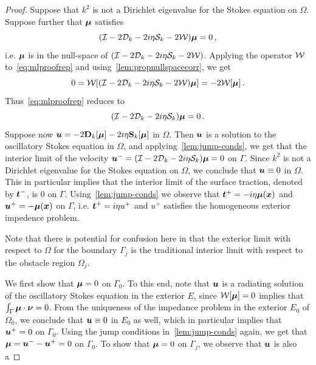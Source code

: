 \begin{proof}
  Suppose that $k^2$ is not a Dirichlet eigenvalue for the
  Stokes equation on $\Omega$. Suppose further that ${\boldsymbol \mu}$ satisfies
  \begin{equation}
    (\mathcal I - 2{\mathcal D}_{k} -2i\eta{\mathcal S}_{k} - 2{\mathcal W}) {\boldsymbol \mu} = 0 \, ,
    \label{eq:mlproofrep}
  \end{equation}
i.e. ${\boldsymbol \mu}$ is in the null-space
of $(\mathcal I - 2 {\mathcal D}_{k} - 2i\eta {\mathcal S}_{k} - 2 {\mathcal W})$. 
Applying the operator ${\mathcal W}$ to~\cref{eq:mlproofrep} and 
using~\cref{lem:propnullspacecorr}, we get
\begin{equation}
0 = {\mathcal W} [(\mathcal I - 2{\mathcal D}_{k} - 2i\eta{\mathcal S}_{k} - 2{\mathcal W}){\boldsymbol \mu}] = -2{\mathcal W} [{\boldsymbol \mu}] \, .
\end{equation}
Thus~\cref{eq:mlproofrep} reduces to
\begin{equation}
(\mathcal I - 2 {\mathcal D}_{k} - 2i\eta {\mathcal S}_{k}){\boldsymbol \mu} = 0\, .
\end{equation}
Suppose now ${\boldsymbol u} = -2{\bf D}_{k}[{\boldsymbol \mu}] -2i\eta{\bf S}_{k}[{\boldsymbol \mu}]$
in $\Omega$. Then ${\boldsymbol u}$ is a solution to the oscillatory
Stokes equation in $\Omega$, and applying~\cref{lem:jump-conds},
we get that the interior limit of the velocity
${\boldsymbol u}^{-} = (\mathcal I - 2{\mathcal D}_{k} -2i\eta{\mathcal S}_{k}) {\boldsymbol \mu} = 0$ on $\Gamma$.
Since $k^2$ is not a Dirichlet eigenvalue for the Stokes equation
on $\Omega$, we conclude that ${\boldsymbol u} \equiv 0$ in $\Omega$. 
This in particular implies that the interior limit of the
surface traction, denoted by ${\boldsymbol t}^{-}$, is $0$ on $\Gamma$.
Using~\cref{lem:jump-conds} we observe that ${\boldsymbol t}^{+}
= -i\eta {\boldsymbol \mu}({\boldsymbol x})$ and ${\boldsymbol u}^{+} = -{\boldsymbol \mu}({\boldsymbol x})$ on $\Gamma$, i.e.
${\boldsymbol t}^{+}=i\eta u^{+}$ and $u^{+}$ satisfies the homogeneous
exterior impedence problem.
\begin{remark}
  Note that there is potential for confusion here
  in that the exterior limit with respect to $\Omega$ 
  for the boundary $\Gamma_{j}$ is the traditional interior 
  limit with respect to the obstacle region $\Omega_{j}$.
\end{remark}
We first show that ${\boldsymbol \mu}=0$ on $\Gamma_{0}$. 
To this end, note that ${\boldsymbol u}$ is a radiating solution
of the oscillatory Stokes equation in the exterior $E$,
since ${\mathcal W}[{\boldsymbol \mu}] = 0$ implies that $\int_{\Gamma} {\boldsymbol \mu}
\cdot {\boldsymbol \nu} = 0$. From the uniqueness of the impedance problem
in the exterior $E_0$ of $\Omega_0$, we conclude that
${\boldsymbol u} \equiv 0$ in $E_0$ as well, which in particular
implies that ${\boldsymbol u}^{+}=0$ on $\Gamma_{0}$.   
Using the jump conditions in~\cref{lem:jump-conds}
again, we get that
${\boldsymbol \mu} = {\boldsymbol u}^{-} - {\boldsymbol u}^{+} = 0$ on
$\Gamma_{0}$. To show that ${\boldsymbol \mu}=0$ on
$\Gamma_{j}$, we observe that ${\boldsymbol u}$ is also a

\end{proof}
